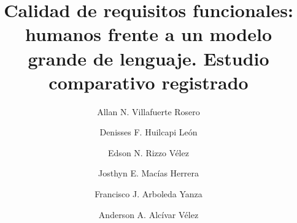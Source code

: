\documentclass[runningheads]{llncs}
\begin{document}
\title{Calidad de requisitos funcionales: humanos frente a un modelo grande
de lenguaje. Estudio comparativo registrado}

\author{
Allan N. Villafuerte Rosero \and
Denisses F. Huilcapi Le\'on \and
Edson N. Rizzo V\'elez \and
Josthyn E. Mac\'ias Herrera \and
Francisco J. Arboleda Yanza \and
Anderson A. Alc\'ivar V\'elez
}

\maketitle
\end{document}
